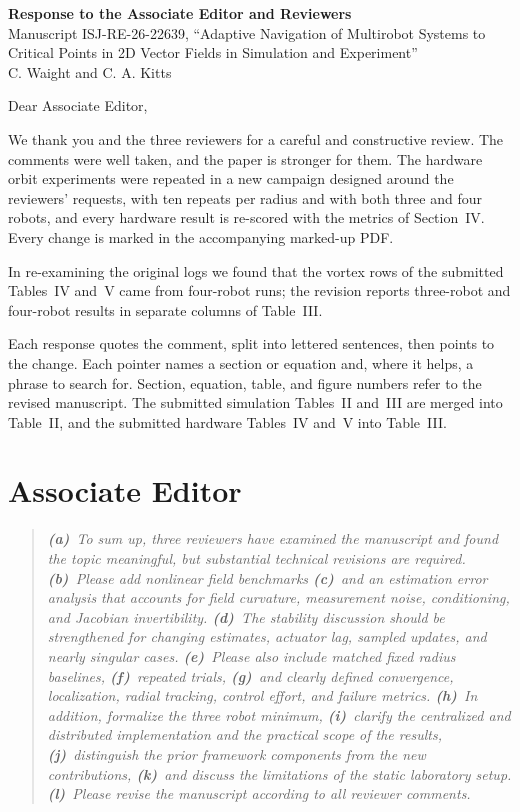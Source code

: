 \documentclass[10pt]{article}
\begin{document}
\begin{center}
{\large\bfseries Response to the Associate Editor and Reviewers}\\[3pt]
Manuscript ISJ-RE-26-22639, ``Adaptive Navigation of Multirobot Systems to Critical Points in 2D Vector Fields in Simulation and Experiment''\\[2pt]
C. Waight and C. A. Kitts
\end{center}

Dear Associate Editor,

We thank you and the three reviewers for a careful and constructive review. The comments were well taken, and the paper is stronger for them. The hardware orbit experiments were repeated in a new campaign designed around the reviewers' requests, with ten repeats per radius and with both three and four robots, and every hardware result is re-scored with the metrics of Section~IV. Every change is marked in the accompanying marked-up PDF.

In re-examining the original logs we found that the vortex rows of the submitted Tables~IV and~V came from four-robot runs; the revision reports three-robot and four-robot results in separate columns of Table~III.

Each response quotes the comment, split into lettered sentences, then points to the change. Each pointer names a section or equation and, where it helps, a phrase to search for. Section, equation, table, and figure numbers refer to the revised manuscript. The submitted simulation Tables~II and~III are merged into Table~II, and the submitted hardware Tables~IV and~V into Table~III.

\section*{Associate Editor}

\begin{quote}\itshape
\textbf{(a)}~To sum up, three reviewers have examined the manuscript and found the topic meaningful, but substantial technical revisions are required.
\textbf{(b)}~Please add nonlinear field benchmarks
\textbf{(c)}~and an estimation error analysis that accounts for field curvature, measurement noise, conditioning, and Jacobian invertibility.
\textbf{(d)}~The stability discussion should be strengthened for changing estimates, actuator lag, sampled updates, and nearly singular cases.
\textbf{(e)}~Please also include matched fixed radius baselines,
\textbf{(f)}~repeated trials,
\textbf{(g)}~and clearly defined convergence, localization, radial tracking, control effort, and failure metrics.
\textbf{(h)}~In addition, formalize the three robot minimum,
\textbf{(i)}~clarify the centralized and distributed implementation and the practical scope of the results,
\textbf{(j)}~distinguish the prior framework components from the new contributions,
\textbf{(k)}~and discuss the limitations of the static laboratory setup.
\textbf{(l)}~Please revise the manuscript according to all reviewer comments.
\end{quote}
\end{document}
